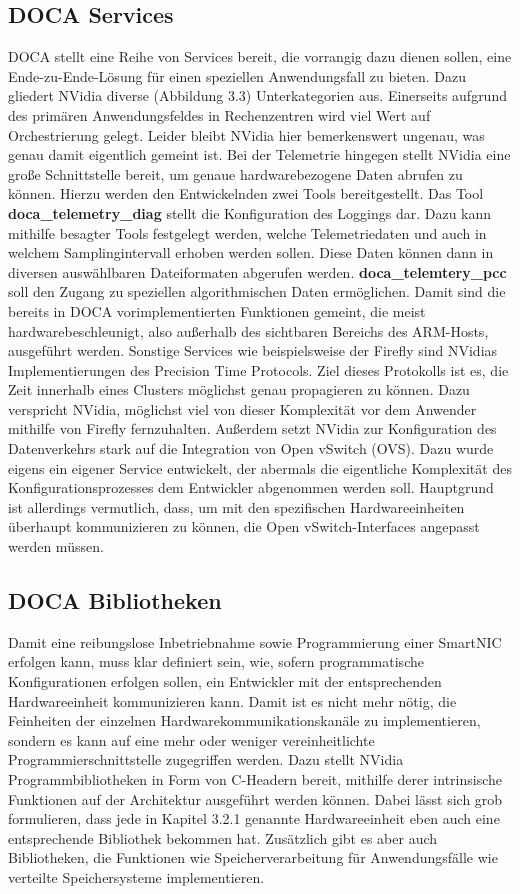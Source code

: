 \subsection{DOCA Services}
DOCA stellt eine Reihe von Services bereit, die vorrangig dazu dienen sollen, eine Ende-zu-Ende-Lösung für einen speziellen Anwendungsfall zu bieten. Dazu gliedert NVidia diverse (Abbildung 3.3) Unterkategorien aus. Einerseits aufgrund des primären Anwendungsfeldes in Rechenzentren wird viel Wert auf Orchestrierung gelegt. Leider bleibt NVidia hier bemerkenswert ungenau, was genau damit eigentlich gemeint ist. Bei der Telemetrie hingegen stellt NVidia eine große Schnittstelle bereit, um genaue hardwarebezogene Daten abrufen zu können. Hierzu werden den Entwickelnden zwei Tools bereitgestellt. Das Tool \textbf{doca\_telemetry\_diag} stellt die Konfiguration des Loggings dar. Dazu kann mithilfe besagter Tools festgelegt werden, welche Telemetriedaten und auch in welchem Samplingintervall erhoben werden sollen. Diese Daten können dann in diversen auswählbaren Dateiformaten abgerufen werden. \textbf{doca\_telemtery\_pcc} soll den Zugang zu speziellen algorithmischen Daten ermöglichen. Damit sind die bereits in DOCA vorimplementierten Funktionen gemeint, die meist hardwarebeschleunigt, also außerhalb des sichtbaren Bereichs des ARM-Hosts, ausgeführt werden. Sonstige Services wie beispielsweise der Firefly sind NVidias Implementierungen des Precision Time Protocols. Ziel dieses Protokolls ist es, die Zeit innerhalb eines Clusters möglichst genau propagieren zu können. Dazu verspricht NVidia, möglichst viel von dieser Komplexität vor dem Anwender mithilfe von Firefly fernzuhalten. Außerdem setzt NVidia zur Konfiguration des Datenverkehrs stark auf die Integration von Open vSwitch (OVS). Dazu wurde eigens ein eigener Service entwickelt, der abermals die eigentliche Komplexität des Konfigurationsprozesses dem Entwickler abgenommen werden soll. Hauptgrund ist allerdings vermutlich, dass, um mit den spezifischen Hardwareeinheiten überhaupt kommunizieren zu können, die Open vSwitch-Interfaces angepasst werden müssen. 
\subsection{DOCA Bibliotheken}
Damit eine reibungslose Inbetriebnahme sowie Programmierung einer SmartNIC erfolgen kann, muss klar definiert sein, wie, sofern programmatische Konfigurationen erfolgen sollen, ein Entwickler mit der entsprechenden Hardwareeinheit kommunizieren kann. Damit ist es nicht mehr nötig, die Feinheiten der einzelnen Hardwarekommunikationskanäle zu implementieren, sondern es kann auf eine mehr oder weniger vereinheitlichte Programmierschnittstelle zugegriffen werden. Dazu stellt NVidia Programmbibliotheken in Form von C-Headern bereit, mithilfe derer intrinsische Funktionen auf der Architektur ausgeführt werden können. Dabei lässt sich grob formulieren, dass jede in Kapitel 3.2.1 genannte Hardwareeinheit eben auch eine entsprechende Bibliothek bekommen hat. Zusätzlich gibt es aber auch Bibliotheken, die Funktionen wie Speicherverarbeitung für Anwendungsfälle wie verteilte Speichersysteme implementieren.
